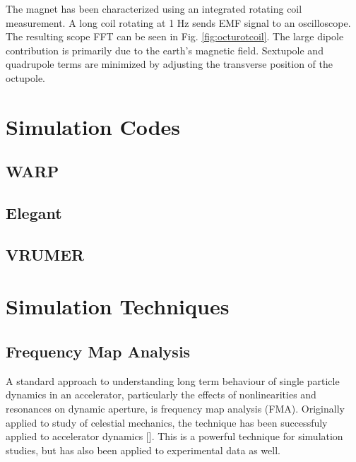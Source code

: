 The magnet has been characterized using an integrated rotating coil measurement. A long coil rotating at 1 Hz sends EMF signal to an oscilloscope. The resulting scope FFT can be seen in Fig. \ref{fig:octurotcoil}. The large dipole contribution is primarily due to the earth’s magnetic field. Sextupole and quadrupole terms are minimized by adjusting the transverse position of the octupole.


\cite{BaumgartnerNAPAC2016}

\section{Simulation Codes}
\subsection{WARP}
\cite{warp}

\subsection{Elegant}
\cite{elegant}

\subsection{VRUMER}
\section{Simulation Techniques}
\subsection{Frequency Map Analysis}

A standard approach to understanding long term behaviour of single particle dynamics in an accelerator, particularly the effects of nonlinearities and resonances on dynamic aperture, is frequency map analysis (FMA). Originally applied to study of celestial mechanics, the technique has been successfuly applied to accelerator dynamics [\cite{Laskar2003}]. This is a powerful technique for simulation studies, but has also been applied to experimental data as well. 

